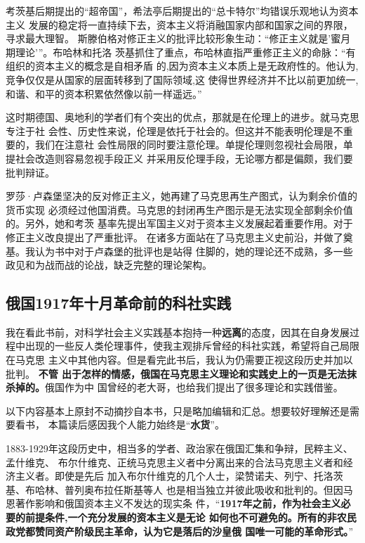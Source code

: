 考茨基后期提出的“超帝国”，希法亭后期提出的“总卡特尔”均错误乐观地认为资本主义
发展的稳定将一直持续下去，资本主义将消融国家内部和国家之间的界限，寻求最大理智。
斯滕伯格对修正主义的批评比较形象生动：“修正主义就是'蜜月期理论'”。布哈林和托洛
茨基抓住了重点，布哈林直指严重修正主义的命脉：“有组织的资本主义的概念是自相矛盾
的,因为资本主义本质上是无政府性的。他认为,竞争仅仅是从国家的层面转移到了国际领域,这
使得世界经济并不比以前更加统一,和谐、和平的资本积累依然像以前一样遥远。”

这时期德国、奥地利的学者们有个突出的优点，那就是在伦理上的进步。就马克思专注于社
会性、历史性来说，伦理是依托于社会的。但这并不能表明伦理是不重要的，我们在注意社
会性局限的同时要注意伦理。单提伦理则忽视社会局限，单提社会改造则容易忽视手段正义
并采用反伦理手段，无论哪方都是偏颇，我们要批判辩证。

罗莎·卢森堡坚决的反对修正主义，她再建了马克思再生产图式，认为剩余价值的货币实现
必须经过他国消费。马克思的封闭再生产图示是无法实现全部剩余价值的。另外，她和考茨
基率先提出军国主义对于资本主义发展起着重要作用。对于修正主义改良提出了严重批评。
在诸多方面站在了马克思主义史前沿，并做了奠基。我认为书中对于卢森堡的批评也是站得
住脚的，她的理论还不成熟，多一些政见和为战而战的论战，缺乏完整的理论架构。

\subsection{俄国1917年十月革命前的科社实践}

我在看此书前，对科学社会主义实践基本抱持一种\textbf{远离}的态度，因其在自身发展过
程中出现的一些反人类伦理事件，使我主观排斥曾经的科社实践，希望将自己局限在马克思
主义中其他内容。但是看完此书后，我认为仍需要正视这段历史并加以批判。 \textbf{不管
  出于怎样的情感，俄国在马克思主义理论和实践史上的一页是无法抹杀掉的。}俄国作为中
国曾经的老大哥，也给我们提出了很多理论和实践借鉴。

以下内容基本上原封不动摘抄自本书，只是略加编辑和汇总。想要较好理解还是需要看书，
本篇读后感因我个人能力始终是“\textbf{水货}”。


1883-1929年这段历史中，相当多的学者、政治家在俄国汇集和争辩，民粹主义、孟什维克、
布尔什维克、正统马克思主义者中分离出来的合法马克思主义者和经济主义者。即使是先后
加入布尔什维克的几个人士，梁赞诺夫、列宁、托洛茨基、布哈林、普列奥布拉任斯基等人
也是相当独立并彼此吸收和批判的。但因马恩著作影响和俄国资本主义不发达的现实条
件，“\textbf{1917年之前，作为社会主义必要的前提条件,一个充分发展的资本主义是无论
  如何也不可避免的。所有的非农民政党都赞同资产阶级民主革命，认为它是落后的沙皇俄
  国唯一可能的革命形式。}”

